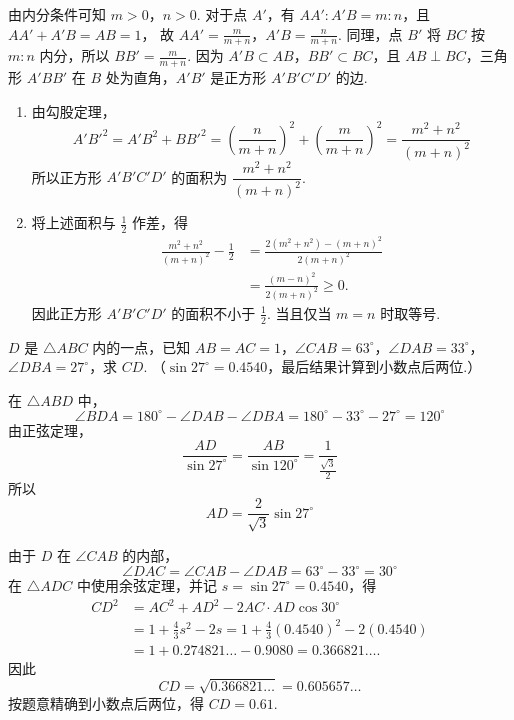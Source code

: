 \begin{solution}
由内分条件可知 \(m>0\)，\(n>0\). 对于点 \(A'\)，有
\(AA':A'B=m:n\)，且 \(AA'+A'B=AB=1\)，
故 \(AA'=\frac{m}{m+n}\)，\(A'B=\frac{n}{m+n}\).
同理，点 \(B'\) 将 \(BC\) 按 \(m:n\) 内分，所以 \(BB'=\frac{m}{m+n}\). 因为 \(A'B\subset AB\)，\(BB'\subset BC\)，且 \(AB\perp BC\)，三角形 \(A'BB'\) 在 \(B\) 处为直角，\(A'B'\) 是正方形 \(A'B'C'D'\) 的边.

\begin{enumerate}
\item 由勾股定理，
\[
A'B'^2=A'B^2+BB'^2
=\left(\frac{n}{m+n}\right)^2+\left(\frac{m}{m+n}\right)^2
=\frac{m^2+n^2}{\left(m+n\right)^2}
\]
所以正方形 \(A'B'C'D'\) 的面积为 \(\dfrac{m^2+n^2}{\left(m+n\right)^2}\).

\item 将上述面积与 \(\frac12\) 作差，得
\[
\begin{aligned}
\frac{m^2+n^2}{\left(m+n\right)^2}-\frac12
&=\frac{2\left(m^2+n^2\right)-\left(m+n\right)^2}{2\left(m+n\right)^2}\\
&=\frac{\left(m-n\right)^2}{2\left(m+n\right)^2}\geq0.
\end{aligned}
\]
因此正方形 \(A'B'C'D'\) 的面积不小于 \(\frac12\). 当且仅当 \(m=n\) 时取等号.
\end{enumerate}
\end{solution}

\begin{problem}
\(D\) 是 \(\triangle ABC\) 内的一点，已知 \(AB=AC=1\)，\(\angle CAB=63^\circ\)，\(\angle DAB=33^\circ\)，\(\angle DBA=27^\circ\)，求 \(CD\). （\(\sin27^\circ=0.4540\)，最后结果计算到小数点后两位.）
\end{problem}

\begin{solution}
在 \(\triangle ABD\) 中，
\[
\angle BDA=180^\circ-\angle DAB-\angle DBA=180^\circ-33^\circ-27^\circ=120^\circ
\]
由正弦定理，
\[
\frac{AD}{\sin27^\circ}=\frac{AB}{\sin120^\circ}=\frac{1}{\frac{\sqrt3}{2}}
\]
所以
\[
AD=\frac{2}{\sqrt3}\sin27^\circ
\]


由于 \(D\) 在 \(\angle CAB\) 的内部，
\[
\angle DAC=\angle CAB-\angle DAB=63^\circ-33^\circ=30^\circ
\]
在 \(\triangle ADC\) 中使用余弦定理，并记 \(s=\sin27^\circ=0.4540\)，得
\[
\begin{aligned}
CD^2
&=AC^2+AD^2-2AC\cdot AD\cos30^\circ\\
&=1+\frac43s^2-2s=1+\frac43(0.4540)^2-2(0.4540)\\
&=1+0.274821\ldots-0.9080=0.366821\ldots.
\end{aligned}
\]
因此
\[
CD=\sqrt{0.366821\ldots}=0.605657\ldots
\]
按题意精确到小数点后两位，得 \(CD=0.61\).
\end{solution}


